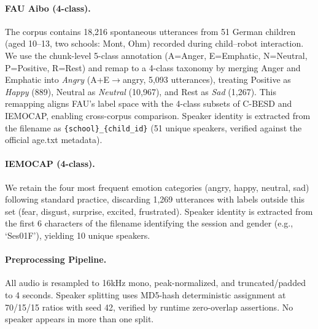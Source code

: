 \paragraph{FAU Aibo (4-class).} The corpus contains 18,216 spontaneous
utterances from 51 German children (aged 10--13, two schools: Mont, Ohm)
recorded during child--robot interaction. We use the chunk-level 5-class
annotation (A=Anger, E=Emphatic, N=Neutral, P=Positive, R=Rest) and remap to
a 4-class taxonomy by merging Anger and Emphatic into \textit{Angry}
(A+E$\rightarrow$angry, 5,093 utterances), treating Positive as \textit{Happy}
(889), Neutral as \textit{Neutral} (10,967), and Rest as \textit{Sad} (1,267).
This remapping aligns FAU's label space with the 4-class subsets of C-BESD and
IEMOCAP, enabling cross-corpus comparison. Speaker identity is extracted from
the filename as \texttt{\{school\}\_\{child\_id\}} (51 unique speakers, verified
against the official age.txt metadata).

\paragraph{IEMOCAP (4-class).} We retain the four most frequent emotion
categories (angry, happy, neutral, sad) following standard practice, discarding
1,269 utterances with labels outside this set (fear, disgust, surprise,
excited, frustrated). Speaker identity is extracted from the first 6 characters
of the filename identifying the session and gender (e.g., `Ses01F'), yielding
10 unique speakers.

\paragraph{Preprocessing Pipeline.} All audio is resampled to 16kHz mono,
peak-normalized, and truncated/padded to 4 seconds. Speaker splitting uses
MD5-hash deterministic assignment at 70/15/15 ratios with seed 42, verified by
runtime zero-overlap assertions. No speaker appears in more than one split.

